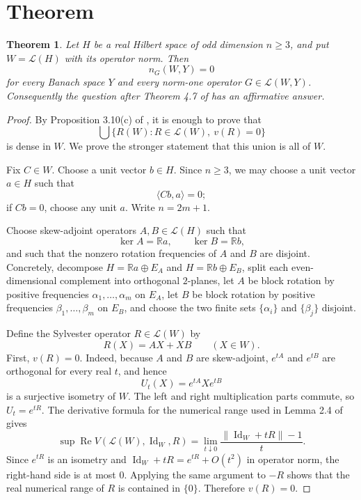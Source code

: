 \documentclass[11pt]{article}
\newtheorem{theorem}{Theorem}
\newcommand{\R}{\mathbb{R}}
\newcommand{\cL}{\mathcal{L}}
\newcommand{\Id}{\operatorname{Id}}
\newcommand{\kerop}{\operatorname{ker}}
\begin{document}
\section*{Theorem}

\begin{theorem}
Let $H$ be a real Hilbert space of odd dimension $n\geq 3$, and put
$W=\cL(H)$ with its operator norm.  Then
\[
  n_G(W,Y)=0
\]
for every Banach space $Y$ and every norm-one operator $G\in\cL(W,Y)$.
Consequently the question after Theorem 4.7 of \cite{KMMPQ} has an
affirmative answer.
\end{theorem}

\begin{proof}
By Proposition 3.10(c) of \cite{KMMPQ}, it is enough to prove that
\[
  \bigcup\{R(W): R\in\cL(W),\ v(R)=0\}
\]
is dense in $W$.  We prove the stronger statement that this union is all of
$W$.

Fix $C\in W$.  Choose a unit vector $b\in H$.  Since $n\geq 3$, we may choose
a unit vector $a\in H$ such that
\[
  \langle Cb,a\rangle=0;
\]
if $Cb=0$, choose any unit $a$.  Write $n=2m+1$.

Choose skew-adjoint operators $A,B\in\cL(H)$ such that
\[
  \kerop A=\R a,\qquad \kerop B=\R b,
\]
and such that the nonzero rotation frequencies of $A$ and $B$ are disjoint.
Concretely, decompose $H=\R a\oplus E_A$ and $H=\R b\oplus E_B$, split each
even-dimensional complement into orthogonal $2$-planes, let $A$ be block
rotation by positive frequencies $\alpha_1,\ldots,\alpha_m$ on $E_A$, let $B$
be block rotation by positive frequencies $\beta_1,\ldots,\beta_m$ on $E_B$,
and choose the two finite sets $\{\alpha_i\}$ and $\{\beta_j\}$ disjoint.

Define the Sylvester operator $R\in\cL(W)$ by
\[
  R(X)=AX+XB\qquad (X\in W).
\]
First, $v(R)=0$.  Indeed, because $A$ and $B$ are skew-adjoint,
$e^{tA}$ and $e^{tB}$ are orthogonal for every real $t$, and hence
\[
  U_t(X)=e^{tA}Xe^{tB}
\]
is a surjective isometry of $W$.  The left and right multiplication parts
commute, so $U_t=e^{tR}$.  The derivative formula for the numerical range
used in Lemma 2.4 of \cite{KMMPQ} gives
\[
 \sup \operatorname{Re} V(\cL(W),\Id_W,R)
 =\lim_{t\downarrow 0}\frac{\|\Id_W+tR\|-1}{t}.
\]
Since $e^{tR}$ is an isometry and $\Id_W+tR=e^{tR}+O(t^2)$ in operator norm,
the right-hand side is at most $0$.  Applying the same argument to $-R$ shows
that the real numerical range of $R$ is contained in $\{0\}$.  Therefore
$v(R)=0$.


\end{proof}
\end{document}
